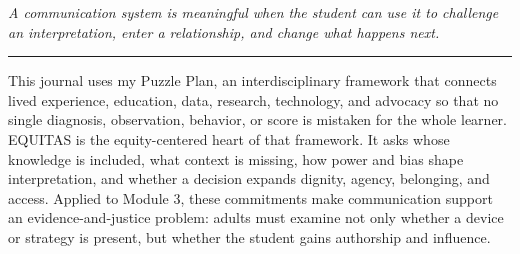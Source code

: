 \documentclass[11pt]{article}
\begin{document}
\begin{titlepage}
\vfill

\begin{center}
\begin{minipage}{0.92\textwidth}
\centering\itshape
A communication system is meaningful when the student can use it to challenge an interpretation, enter a relationship, and change what happens next.\\
{\color{PrimaryRed}\rule{4.5in}{0.8pt}}
\end{minipage}
\end{center}

\vfill

\begin{center}
\begin{minipage}{0.95\textwidth}
\small
This journal uses my Puzzle Plan, an interdisciplinary framework that connects lived experience, education, data, research, technology, and advocacy so that no single diagnosis, observation, behavior, or score is mistaken for the whole learner. EQUITAS is the equity-centered heart of that framework. It asks whose knowledge is included, what context is missing, how power and bias shape interpretation, and whether a decision expands dignity, agency, belonging, and access. Applied to Module 3, these commitments make communication support an evidence-and-justice problem: adults must examine not only whether a device or strategy is present, but whether the student gains authorship and influence.
\end{minipage}
\end{center}

\restoregeometry
\end{titlepage}
\hypersetup{pageanchor=true}






\clearpage
\footnotesize

\end{document}
